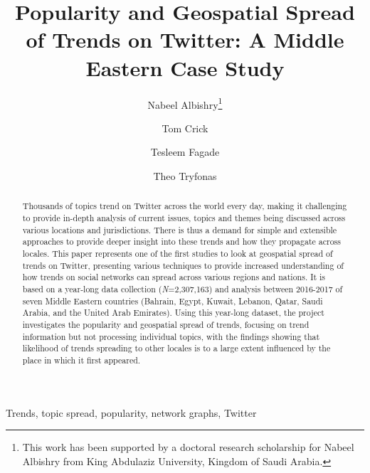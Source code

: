 \documentclass{llncs}
\begin{document}
\title{Popularity and Geospatial Spread of Trends on Twitter: A Middle
Eastern Case Study}

\author{Nabeel Albishry\thanks{This work has been supported by a doctoral research scholarship for
Nabeel Albishry from King Abdulaziz University, Kingdom of Saudi
Arabia.} \and Tom
  Crick \and Tesleem Fagade \and Theo Tryfonas}


\maketitle

\begin{abstract}
Thousands of topics trend on Twitter across the world every day,
making it challenging to provide in-depth analysis of current issues,
topics and themes being discussed across various locations and
jurisdictions. There is thus a demand for simple and extensible
approaches to provide deeper insight into these trends and how they
propagate across locales. This paper represents one of the first
studies to look at geospatial spread of trends on Twitter, presenting
various techniques to provide increased understanding of how trends on
social networks can spread across various regions and nations. It is
based on a year-long data collection ({\emph{N}}=2,307,163) and
analysis between 2016-2017 of seven Middle Eastern countries (Bahrain,
Egypt, Kuwait, Lebanon, Qatar, Saudi Arabia, and the United Arab
Emirates). Using this year-long dataset, the project investigates the
popularity and geospatial spread of trends, focusing on trend
information but not processing individual topics, with the findings
showing that likelihood of trends spreading to other locales is to a
large extent influenced by the place in which it first appeared.
 \end{abstract}

\begin{keywords}
Trends, topic spread, popularity, network graphs, Twitter
\end{keywords}
\end{document}
